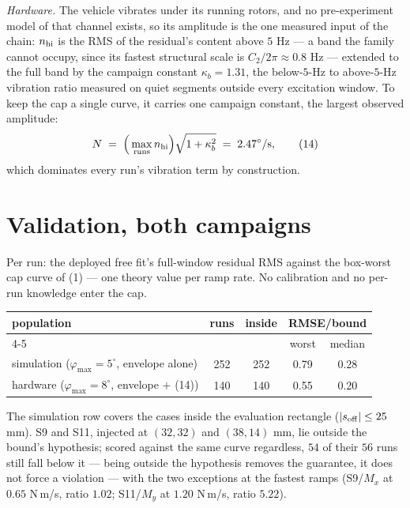 \documentclass[10pt]{article}
\begin{document}
\emph{Hardware.} The vehicle vibrates under its running rotors, and
no pre-experiment model of that channel exists, so its amplitude is
the one measured input of the chain: $n_{\rm hi}$ is the RMS of the
residual's content above $5$ Hz --- a band the family cannot
occupy, since its fastest structural scale is
$C_2/2\pi \approx 0.8$ Hz --- extended to the full band by the
campaign constant $\kappa_b = 1.31$, the below-$5$-Hz to
above-$5$-Hz vibration ratio measured on quiet segments outside
every excitation window. To keep the cap a single curve, it carries
one campaign constant, the largest observed amplitude:
\begin{equation}
  N \;=\; \Big(\max_{\rm runs} n_{\rm hi}\Big)
  \sqrt{1 + \kappa_b^2} \;=\; 2.47^\circ/\mathrm{s},
  \tag{14}
\end{equation}
which dominates every run's vibration term by construction.

\section{Validation, both campaigns}

Per run: the deployed free fit's full-window residual RMS against
the box-worst cap curve of (1) --- one theory value per ramp rate.
No calibration and no per-run knowledge enter the cap.

\begin{center}\small
\begin{tabular}{@{}lcccc@{}}
\toprule
population & runs & inside & \multicolumn{2}{c}{RMSE/bound}\\
\cmidrule(lr){4-5}
 & & & worst & median\\
\midrule
simulation ($\varphi_{\max}=5^\circ$, envelope alone)
  & 252 & 252 & 0.79 & 0.28\\
hardware ($\varphi_{\max}=8^\circ$, envelope $+$ (14))
  & 140 & 140 & 0.55 & 0.20\\
\bottomrule
\end{tabular}
\end{center}

The simulation row covers the cases inside the evaluation rectangle
($|s_{\rm off}| \le 25$ mm). S9 and S11, injected at $(32,32)$ and
$(38,14)$ mm, lie outside the bound's hypothesis; scored against the
same curve regardless, $54$ of their $56$ runs still fall below it
--- being outside the hypothesis removes the guarantee, it does not
force a violation --- with the two exceptions at the fastest ramps
(S9/$M_x$ at $0.65$ N\,m/s, ratio $1.02$; S11/$M_y$ at $1.20$
N\,m/s, ratio $5.22$).
\end{document}
